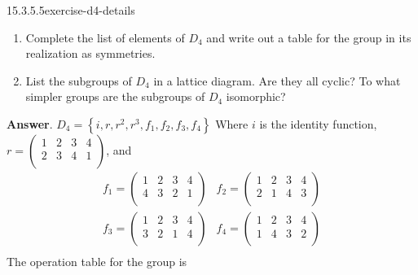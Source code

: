 \documentclass[twoside,10pt,]{book}
\numberwithin{equation}{section}
\begin{document}
\begin{divisionsolution}{15.3.5.5}{}{exercise-d4-details}%
\hypertarget{p-5504}{}%
\leavevmode%
\begin{enumerate}[label=(\alph*)]
\item\hypertarget{li-2443}{}\hypertarget{p-5505}{}%
Complete the list of elements of \(D_4\) and write out a table for the group in its realization as symmetries.%
\item\hypertarget{li-2444}{}\hypertarget{p-5506}{}%
List the subgroups of \(D_4\) in a lattice diagram. Are they all cyclic? To what simpler groups are the subgroups of \(D_4\) isomorphic?%
\end{enumerate}
%
\par\smallskip%
\noindent\textbf{Answer}.\quad%
\hypertarget{p-5507}{}%
\(D_4 = \left\{i, r, r^2, r^3, f_1, f_2, f_3, f_4\right\}\) Where \(i\) is the identity function, \(r=\left(
\begin{array}{cccc}
1 & 2 & 3 & 4 \\
2 & 3 & 4 & 1 \\
\end{array}
\right)\), and%
\begin{equation*}
\begin{array}{cc}
f_1 =\left(
\begin{array}{cccc}
1 & 2 & 3 & 4 \\
4 & 3 & 2 & 1 \\
\end{array}
\right) & f_2 =\left(
\begin{array}{cccc}
1 & 2 & 3 & 4 \\
2 & 1 & 4 & 3 \\
\end{array}
\right) \\
f_3 =\left(
\begin{array}{cccc}
1 & 2 & 3 & 4 \\
3 & 2 & 1 & 4 \\
\end{array}
\right) & f_4 =\left(
\begin{array}{cccc}
1 & 2 & 3 & 4 \\
1 & 4 & 3 & 2 \\
\end{array}
\right) \\
\end{array}
\end{equation*}
The operation table for the group is%
\begin{equation*}
\begin{array}{c|c}

\end{array}
\end{equation*}
\end{divisionsolution}
\end{document}
